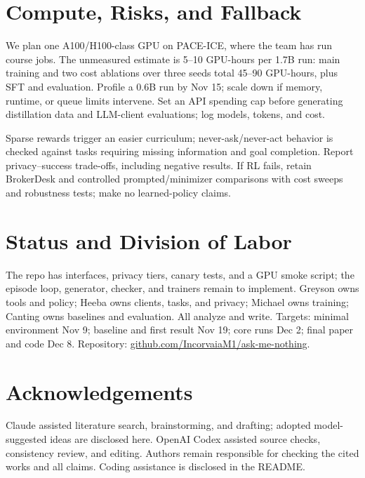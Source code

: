\documentclass[11pt]{article}
\begin{document}
\section{Compute, Risks, and Fallback}
We plan one A100/H100-class GPU on PACE-ICE, where the team has run course jobs. The unmeasured estimate is 5--10 GPU-hours per 1.7B run: main training and two cost ablations over three seeds total 45--90 GPU-hours, plus SFT and evaluation. Profile a 0.6B run by Nov 15; scale down if memory, runtime, or queue limits intervene. Set an API spending cap before generating distillation data and LLM-client evaluations; log models, tokens, and cost.

Sparse rewards trigger an easier curriculum; never-ask/never-act behavior is checked against tasks requiring missing information and goal completion. Report privacy--success trade-offs, including negative results. If RL fails, retain BrokerDesk and controlled prompted/minimizer comparisons with cost sweeps and robustness tests; make no learned-policy claims.

\section{Status and Division of Labor}
The repo has interfaces, privacy tiers, canary tests, and a GPU smoke script; the episode loop, generator, checker, and trainers remain to implement. Greyson owns tools and policy; Heeba owns clients, tasks, and privacy; Michael owns training; Canting owns baselines and evaluation. All analyze and write. Targets: minimal environment Nov 9; baseline and first result Nov 19; core runs Dec 2; final paper and code Dec 8. Repository: \href{https://github.com/IncorvaiaM1/ask-me-nothing}{github.com/IncorvaiaM1/ask-me-nothing}.

\section*{Acknowledgements}
Claude assisted literature search, brainstorming, and drafting; adopted model-suggested ideas are disclosed here. OpenAI Codex assisted source checks, consistency review, and editing. Authors remain responsible for checking the cited works and all claims. Coding assistance is disclosed in the README.


\end{document}
